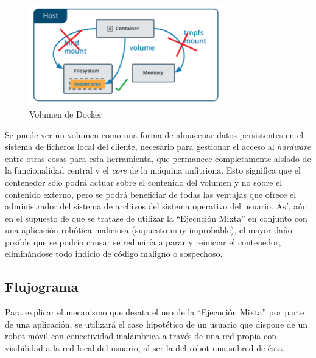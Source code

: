 \clearpage
\begin{figure}[!hbtp]  \centering\noindent
    \includegraphics[width=0.75\textwidth]{figures/volumen.png}
    \caption{Volumen de Docker}
    \label{volumen}
\end{figure}

Se puede ver un volumen como una forma de almacenar datos persistentes en el sistema de ficheros local del cliente, necesario para gestionar el acceso al \textit{hardware} entre otras cosas para esta herramienta, que permanece completamente aislado de la funcionalidad central y el \textit{core} de la máquina anfitriona. Esto significa que el contenedor sólo podrá actuar sobre el contenido del volumen y no sobre el contenido externo, pero se podrá beneficiar de todas las ventajas que ofrece el administrador del sistema de archivos del sistema operativo del usuario. Así, aún en el supuesto de que se tratase de utilizar la ``Ejecución Mixta'' en conjunto con una aplicación robótica maliciosa (supuesto muy improbable), el mayor daño posible que se podría causar se reduciría a parar y reiniciar el contenedor, eliminándose todo indicio de código maligno o sospechoso.

\subsection{Flujograma}



Para explicar el mecanismo que desata el uso de la ``Ejecución Mixta'' por parte de una aplicación, se utilizará el caso hipotético de un usuario que dispone de un robot móvil con conectividad inalámbrica a través de una red propia con visibilidad a la red local del usuario, al ser la del robot una subred de ésta.

